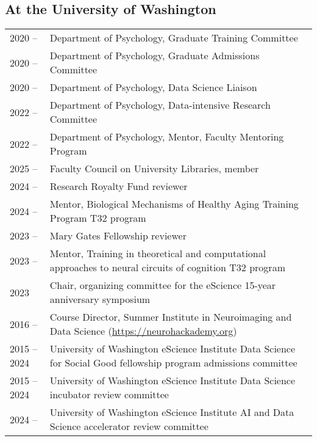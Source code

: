 \documentclass[11pt,fullpage]{article}
\begin{document}
\subsection*{At the University of Washington}
\begin{tabular}{p{}p{}}
2020 -- & Department of Psychology, Graduate Training Committee\\
2020 -- & Department of Psychology, Graduate Admissions Committee\\
2020 -- & Department of Psychology, Data Science Liaison\\
2022 -- & Department of Psychology, Data-intensive Research Committee\\
2022 -- & Department of Psychology, Mentor, Faculty Mentoring Program\\
2025 -- & Faculty Council on University Libraries, member\\
2024 -- & Research Royalty Fund reviewer \\
2024 -- & Mentor, Biological Mechanisms of Healthy Aging Training Program T32 program\\
2023 -- & Mary Gates Fellowship reviewer\\
2023 -- & Mentor, Training in theoretical and computational approaches to neural circuits of cognition T32 program\\
2023 & Chair, organizing committee for the eScience 15-year anniversary symposium\\
2016 -- & Course Director, Summer Institute in Neuroimaging and Data Science (\url{https://neurohackademy.org})\\
2015 -- 2024 & University of Washington eScience Institute Data Science for Social Good fellowship program admissions committee\\
2015 -- 2024 & University of Washington eScience Institute Data Science incubator review committee\\
2024 -- & University of Washington eScience Institute AI and Data Science accelerator review committee\\
\end{tabular}
\end{document}
